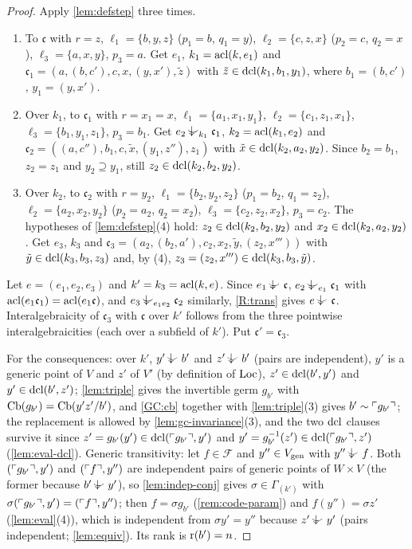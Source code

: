 \begin{proof}
Apply \cref{lem:defstep} three times.
\begin{enumerate}[nosep]
\item To $\mathfrak c$ with $r=z$, $\ell_1=\{b,y,z\}$ ($p_1=b$, $q_1=y$),
  $\ell_2=\{c,z,x\}$ ($p_2=c$, $q_2=x$), $\ell_3=\{a,x,y\}$, $p_3=a$.  Get $e_1$,
  $k_1=\operatorname{acl}(k,e_1)$ and $\mathfrak c_1=(a,(b,c'),c,x,(y,x'),\tilde z)$ with
  $\tilde z\in\operatorname{dcl}(k_1,b_1,y_1)$, where $b_1=(b,c')$, $y_1=(y,x')$.
\item Over $k_1$, to $\mathfrak c_1$ with $r=x_1=x$, $\ell_1=\{a_1,x_1,y_1\}$,
  $\ell_2=\{c_1,z_1,x_1\}$, $\ell_3=\{b_1,y_1,z_1\}$, $p_3=b_1$.  Get $e_2\ind{k_1}\mathfrak c_1$,
  $k_2=\operatorname{acl}(k_1,e_2)$ and $\mathfrak c_2=((a,c''),b_1,c,\tilde x,(y_1,z''),z_1)$ with
  $\tilde x\in\operatorname{dcl}(k_2,a_2,y_2)$.  Since $b_2=b_1$, $z_2=z_1$ and $y_2\supseteq y_1$, still
  $z_2\in\operatorname{dcl}(k_2,b_2,y_2)$.
\item Over $k_2$, to $\mathfrak c_2$ with $r=y_2$, $\ell_1=\{b_2,y_2,z_2\}$ ($p_1=b_2$,
  $q_1=z_2$), $\ell_2=\{a_2,x_2,y_2\}$ ($p_2=a_2$, $q_2=x_2$), $\ell_3=\{c_2,z_2,x_2\}$,
  $p_3=c_2$.  The hypotheses of \cref{lem:defstep}(4) hold: $z_2\in\operatorname{dcl}(k_2,b_2,y_2)$
  and $x_2\in\operatorname{dcl}(k_2,a_2,y_2)$.  Get $e_3$, $k_3$ and
  $\mathfrak c_3=(a_2,(b_2,a'),c_2,x_2,\tilde y,(z_2,x'''))$ with
  $\tilde y\in\operatorname{dcl}(k_3,b_3,z_3)$ and, by (4), $z_3=(z_2,x''')\in\operatorname{dcl}(k_3,b_3,\tilde y)$.
\end{enumerate}
Let $e=(e_1,e_2,e_3)$ and $k'=k_3=\operatorname{acl}(k,e)$.  Since $e_1\ind{}\mathfrak c$,
$e_2\ind{e_1}\mathfrak c_1$ with $\operatorname{acl}(e_1\mathfrak c_1)=\operatorname{acl}(e_1\mathfrak c)$, and
$e_3\ind{e_1e_2}\mathfrak c_2$ similarly, \ref{R:trans} gives $e\ind{}\mathfrak c$.
Interalgebraicity of $\mathfrak c_3$ with $\mathfrak c$ over $k'$ follows from the three
pointwise interalgebraicities (each over a subfield of $k'$).  Put $\mathfrak c'=\mathfrak c_3$.

For the consequences: over $k'$, $y'\ind{}b'$ and $z'\ind{}b'$ (pairs are independent),
$y'$ is a generic point of $V$ and $z'$ of $V'$ (by definition of $\operatorname{Loc}$),
$z'\in\operatorname{dcl}(b',y')$ and $y'\in\operatorname{dcl}(b',z')$; \cref{lem:triple} gives the invertible germ
$g_{b'}$ with $\operatorname{Cb}(g_{b'})=\operatorname{Cb}(y'z'/b')$, and \ref{GC:cb} together with
\cref{lem:triple}(3) gives $b'\sim\ulcorner g_{b'}\urcorner$; the replacement is allowed by
\cref{lem:gc-invariance}(3), and the two $\operatorname{dcl}$ clauses survive it since
$z'=g_{b'}(y')\in\operatorname{dcl}(\ulcorner g_{b'}\urcorner,y')$ and $y'=g_{b'}^{-1}(z')\in\operatorname{dcl}(\ulcorner g_{b'}\urcorner,z')$
(\cref{lem:eval-dcl}).  Generic transitivity: let $f\in\mathcal F$ and $y''\in V_{\operatorname{gen}}$
with $y''\ind{}f$.  Both $(\ulcorner g_{b'}\urcorner,y')$ and $(\ulcorner f\urcorner,y'')$ are independent pairs
of generic points of $W\times V$ (the former because $b'\ind{}y'$), so
\cref{lem:indep-conj} gives $\sigma\in\Gamma_{(k')}$ with
$\sigma(\ulcorner g_{b'}\urcorner,y')=(\ulcorner f\urcorner,y'')$; then $f=\sigma g_{b'}$ (\cref{rem:code-param})
and $f(y'')=\sigma z'$ (\cref{lem:eval}(4)), which is independent from $\sigma y'=y''$
because $z'\ind{}y'$ (pairs independent; \cref{lem:equiv}).  Its rank is $\operatorname{r}(b')=n$.
\end{proof}

